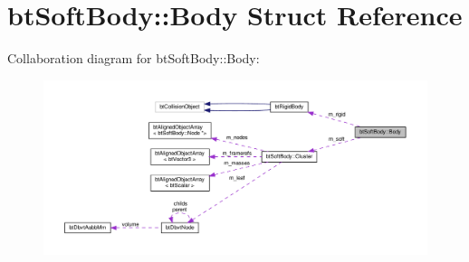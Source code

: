 \hypertarget{structbtSoftBody_1_1Body}{}\section{bt\+Soft\+Body\+:\+:Body Struct Reference}
\label{structbtSoftBody_1_1Body}


Collaboration diagram for bt\+Soft\+Body\+:\+:Body\+:
\nopagebreak
\begin{figure}[H]
\begin{center}
\leavevmode
\includegraphics[width=350pt]{structbtSoftBody_1_1Body__coll__graph}
\end{center}
\end{figure}
